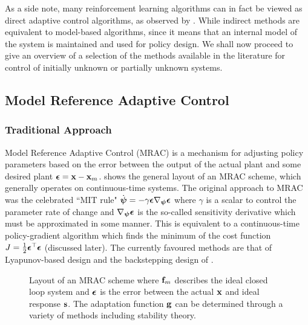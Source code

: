 As a side note, many reinforcement learning algorithms can in fact be viewed as direct adaptive control algorithms, as observed by \cite{SBW92}. While indirect methods are equivalent to model-based algorithms, since it means that an internal model of the system is maintained and used for policy design.
We shall now proceed to give an overview of a selection of the methods available in the literature for control of initially unknown or partially unknown systems.


\subsection{Model Reference Adaptive Control}
\subsubsection{Traditional Approach}
Model Reference Adaptive Control (MRAC) is a mechanism for adjusting policy parameters based on the error between the output of the actual plant and some desired plant $\boldsymbol{\epsilon} = \mathbf{x} - \mathbf{x}_m$.  shows the general layout of an MRAC scheme, which generally operates on continuous-time systems. The original approach to MRAC was the celebrated ``MIT rule" $\dot{\boldsymbol{\psi}} = - \gamma \boldsymbol{\epsilon} \nabla_{\boldsymbol{\psi}} \boldsymbol{\epsilon}$ where $\gamma$ is a scalar to control the parameter rate of change and $\nabla_{\boldsymbol{\psi}} \boldsymbol{\epsilon}$ is the so-called sensitivity derivative which must be approximated in some manner. This is equivalent to a continuous-time policy-gradient algorithm which finds the minimum of the cost function $J = \frac{1}{2}\boldsymbol{\epsilon}^\top\boldsymbol{\epsilon}$ (discussed later). The currently favoured methods are that of Lyapunov-based design and the backstepping design of \cite{KKK95}. 

\begin{figure}
\centering

\caption{Layout of an MRAC scheme where $\mathbf{f}_m$ describes the ideal closed loop system and $\boldsymbol{\epsilon}$ is the error between the actual $\mathbf{x}$ and ideal response $\mathbf{s}$. The adaptation function $\mathbf{g}$ can be determined through a variety of methods including stability theory.}
\label{fig:MRAC}
\end{figure}


